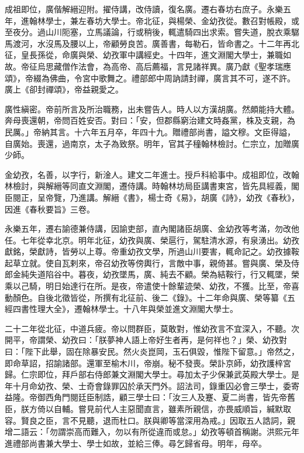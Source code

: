 \begin{pinyinscope}
成祖即位，廣偕解縉迎附。擢侍講，改侍讀，復名廣。遷右春坊右庶子。永樂五年，進翰林學士，兼左春坊大學士。帝北征，與楊榮、金幼孜從。數召對帳殿，或至夜分。過山川阨塞，立馬議論，行或稍後，輒遣騎四出求索。嘗失道，脫衣乘驏馬渡河，水沒馬及腰以上，帝顧勞良苦。廣善書，每勒石，皆命書之。十二年再北征，皇長孫從，命廣與榮、幼孜軍中講經史。十四年，進文淵閣大學士，兼職如故。帝征烏思藏僧作法會，為高帝、高后薦福，言見諸祥異。廣乃獻《聖孝瑞應頌》，帝綴為佛曲，令宮中歌舞之。禮部郎中周訥請封禪，廣言其不可，遂不許。廣上《卻封禪頌》，帝益親愛之。

廣性縝密。帝前所言及所治職務，出未嘗告人。時人以方漢胡廣。然頗能持大體。奔母喪還朝，帝問百姓安否。對曰：「安，但郡縣窮治建文時姦黨，株及支親，為民厲。」帝納其言。十六年五月卒，年四十九。贈禮部尚書，謚文穆。文臣得謚，自廣始。喪還，過南京，太子為致祭。明年，官其子穜翰林檢討。仁宗立，加贈廣少師。

金幼孜，名善，以字行，新淦人。建文二年進士。授戶科給事中。成祖即位，改翰林檢討，與解縉等同直文淵閣，遷侍講。時翰林坊局臣講書東宮，皆先具經義，閣臣閱正，呈帝覽，乃進講。解縉《書》，楊士奇《易》，胡廣《詩》，幼孜《春秋》，因進《春秋要旨》三卷。

永樂五年，遷右諭德兼侍講，因諭吏部，直內閣諸臣胡廣、金幼孜等考滿，勿改他任。七年從幸北京。明年北征，幼孜與廣、榮扈行，駕駐清水源，有泉湧出。幼孜獻銘，榮獻詩，皆勞以上尊。帝重幼孜文學，所過山川要害，輒命記之。幼孜據鞍起草立就。使自瓦剌來，帝召幼孜等傍輿行，言敵中事，親倚甚。嘗與廣、榮及侍郎金純失道陷谷中。暮夜，幼孜墜馬，廣、純去不顧。榮為結鞍行，行又輒墜，榮乘以己騎，明日始達行在所。是夜，帝遣使十餘輩迹榮、幼孜，不獲。比至，帝喜動顏色。自後北徵皆從，所撰有北征前、後二《錄》。十二年命與廣、榮等纂《五經四書性理大全》，遷翰林學士。十八年與榮並進文淵閣大學士。

二十二年從北征，中道兵疲。帝以問群臣，莫敢對，惟幼孜言不宜深入，不聽。次開平，帝謂榮、幼孜曰：「朕夢神人語上帝好生者再，是何祥也？」榮、幼孜對曰：「陛下此舉，固在除暴安民。然火炎崑岡，玉石俱毀，惟陛下留意。」帝然之，即命草詔，招諭諸部。還軍至榆木川，帝崩。秘不發喪。榮訃京師，幼孜護梓宮歸。仁宗即位，拜戶部右侍郎兼文淵閣大學士。尋加太子少保兼武英殿大學士。是年十月命幼孜、榮、士奇會錄罪囚於承天門外。詔法司，錄重囚必會三學士，委寄益隆。帝御西角門閱廷臣制誥，顧三學士曰：「汝三人及蹇、夏二尚書，皆先帝舊臣，朕方倚以自輔。嘗見前代人主惡聞直言，雖素所親信，亦畏威順旨，緘默取容。賢良之臣，言不見聽，退而杜口。朕與卿等當深用為戒。」因取五人誥詞，親增二語云：「勿謂崇高而難入，勿以有所從違而或怠。」幼孜等頓首稱謝。洪熙元年進禮部尚書兼大學士、學士如故，並給三俸。尋乞歸省母。明年，母卒。


\end{pinyinscope}
